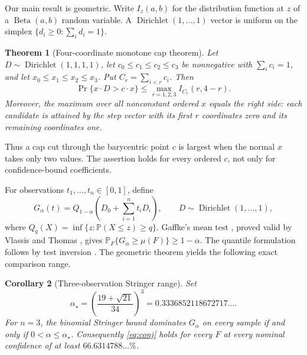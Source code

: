 \documentclass[11pt]{article}
\newtheorem{theorem}{Theorem}
\newtheorem{corollary}[theorem]{Corollary}
\theoremstyle{definition}
\newcommand{\pr}{\mathbb{P}}
\begin{document}
Our main result is geometric. Write $I_z(a,b)$ for the distribution
function at $z$ of a $\operatorname{Beta}(a,b)$ random variable. A
$\operatorname{Dirichlet}(1,\ldots,1)$ vector is uniform on the simplex
$\{d_i\ge0:\sum_i d_i=1\}$.

\begin{theorem}[Four-coordinate monotone cap theorem]\label{thm:fourcap}
Let $D\sim\operatorname{Dirichlet}(1,1,1,1)$, let
$c_0\le c_1\le c_2\le c_3$ be nonnegative with $\sum_i c_i=1$, and let
$x_0\le x_1\le x_2\le x_3$.  Put $C_r=\sum_{i<r}c_i$.  Then
\begin{equation}\label{eq:fourcaptheorem}
 \Pr\{x\mathbin{\cdot}D>c\mathbin{\cdot}x\}
 \le\max_{r=1,2,3}I_{C_r}(r,4-r).
\end{equation}
Moreover, the maximum over all nonconstant ordered $x$ equals the right side:
each candidate is attained by the step vector with its first $r$ coordinates
zero and its remaining coordinates one.
\end{theorem}


Thus a cap cut through the barycentric point $c$ is largest when the
normal $x$ takes only two values. The assertion holds for every ordered
$c$, not only for confidence-bound coefficients.

For observations $t_1,\ldots,t_n\in[0,1]$, define
\begin{equation}\label{eq:gaffke}
 G_\alpha(t)=Q_{1-\alpha}\!\left(D_0+\sum_{i=1}^n t_iD_i\right),
 \qquad D\sim\operatorname{Dirichlet}(1,\ldots,1),
\end{equation}
where $Q_q(X)=\inf\{z:\pr(X\le z)\ge q\}$. Gaffke's mean test
\cite{gaffke2005}, proved valid by Vlassis and Thomas
\cite[Theorem~1]{vlassis2026}, gives
$\pr_F\{G_\alpha\ge\mu(F)\}\ge1-\alpha$.
The quantile formulation follows by test inversion
\cite[Theorem~5.1 and Corollary~5.2]{ming2026}.
The geometric theorem yields the following exact comparison range.

\begin{corollary}[Three-observation Stringer range]\label{cor:n3expanded}
Set
\begin{equation}\label{eq:alphastar}
 \alpha_\star=\left(\frac{19+\sqrt{21}}{34}\right)^3
 =0.3336852118672717\ldots .
\end{equation}
For $n=3$, the binomial Stringer bound dominates $G_\alpha$ on every
sample if and only if $0<\alpha\le\alpha_\star$. Consequently
\eqref{eq:conj} holds for every $F$ at every nominal confidence of at least
$66.6314788\ldots\%$.
\end{corollary}
\end{document}
